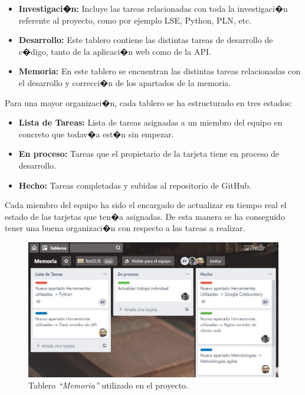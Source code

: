 \begin{itemize}
	
	\item \textbf{Investigaci�n:} Incluye las tareas relacionadas con toda la investigaci�n referente al proyecto, como por ejemplo LSE, Python, PLN, etc.
	
	\item \textbf{Desarrollo:} Este tablero contiene las distintas tareas de desarrollo de c�digo, tanto de la aplicaci�n web como de la API.
	
	\item \textbf{Memoria:} En este tablero se encuentran las distintas tareas relacionadas con el desarrollo y correcci�n de los apartados de la memoria.
	
\end{itemize}

Para una mayor organizaci�n, cada tablero se ha estructurado en tres estados:

\begin{itemize}
	
	\item \textbf{Lista de Tareas:} Lista de tareas asignadas a un miembro del equipo en concreto que todav�a est�n sin empezar.
	
	\item \textbf{En proceso:} Tareas que el propietario de la tarjeta tiene en proceso de desarrollo. 
	
	\item \textbf{Hecho:} Tareas completadas y subidas al repositorio de GitHub.
	
\end{itemize}

Cada miembro del equipo ha sido el encargado de actualizar en tiempo real el estado de las tarjetas que ten�a asignadas. De esta manera se ha conseguido tener una buena organizaci�n con respecto a las tareas a realizar.

\begin{figure}[]
	\centering
	\includegraphics[width=1\textwidth]{Imagenes/Fuentes/Metodologias/trello.jpg}
	\caption{Tablero \textit{``Memoria''} utilizado en el proyecto.  }
	\label {fig: imgTrello}
\end{figure}
 



